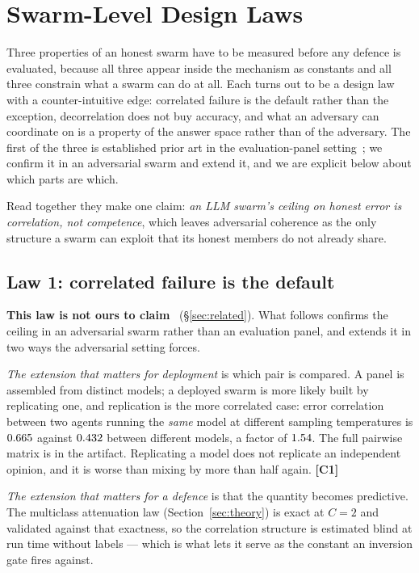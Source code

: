\section{Swarm-Level Design Laws}
\label{sec:designlaws}

Three properties of an honest swarm have to be measured before any defence is
evaluated, because all three appear inside the mechanism as constants and all
three constrain what a swarm can do at all. Each turns out to be a design law
with a counter-intuitive edge: correlated failure is the default rather than the
exception, decorrelation does not buy accuracy, and what an adversary can
coordinate on is a property of the answer space rather than of the adversary.
The first of the three is established prior art in the evaluation-panel
setting~\cite{judgecorr,panelcorr,hivemind}; we confirm it in an adversarial
swarm and extend it, and we are explicit below about which parts are which.

Read together they make one claim: \emph{an LLM swarm's ceiling on honest error
is correlation, not competence}, which leaves adversarial coherence as the only
structure a swarm can exploit that its honest members do not already share.

\subsection{Law 1: correlated failure is the default}

\textbf{This law is not ours to claim}~\cite{judgecorr,panelcorr,hivemind}
(\S\ref{sec:related}). What follows confirms the ceiling in an adversarial swarm
rather than an evaluation panel, and extends it in two ways the adversarial
setting forces.

\emph{The extension that matters for deployment} is which pair is compared. A
panel is assembled from distinct models; a deployed swarm is more likely built by
replicating one, and replication is the more correlated case: error correlation
between two agents running the \emph{same} model at different sampling
temperatures is $0.665$ against $0.432$ between
different models, a factor of $1.54$. The full pairwise matrix is in the
artifact. Replicating a model does not replicate an independent opinion, and it
is worse than mixing by more than half again. \textbf{[C1]}

\emph{The extension that matters for a defence} is that the quantity becomes
predictive. The multiclass attenuation law (Section~\ref{sec:theory}) is exact at
$C=2$ and validated against that exactness, so the correlation structure is
estimated blind at run time without labels --- which is what lets it serve as the
constant an inversion gate fires against.

